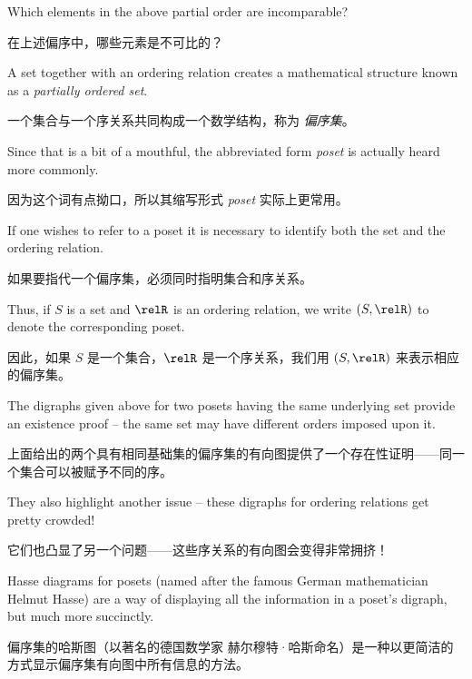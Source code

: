 \begin{center}

\end{center}

\begin{exer}
Which elements in the above partial order are incomparable?
\end{exer}

\begin{exer}
在上述偏序中，哪些元素是不可比的？
\end{exer}

A set together with an ordering relation creates a mathematical 
structure known as a \emph{partially
ordered set}.

一个集合与一个序关系共同构成一个数学结构，称为 \emph{偏序集}。

Since that is a bit of a mouthful, the abbreviated
form \emph{poset} is actually heard more commonly.

因为这个词有点拗口，所以其缩写形式 \emph{poset} 实际上更常用。

If one wishes to refer to a poset it is necessary to identify
both the set and the ordering relation.

如果要指代一个偏序集，必须同时指明集合和序关系。

Thus, if $S$ is a set
and $\relR$ is an ordering relation, we write $(S, \relR)$ to
denote the corresponding poset.

因此，如果 $S$ 是一个集合，$\relR$ 是一个序关系，我们用 $(S, \relR)$ 来表示相应的偏序集。

The digraphs given above for two posets having the same underlying
set provide an existence proof -- the same set may have different 
orders imposed upon it.

上面给出的两个具有相同基础集的偏序集的有向图提供了一个存在性证明——同一个集合可以被赋予不同的序。

They also highlight another issue -- these
digraphs for ordering relations get pretty crowded!

它们也凸显了另一个问题——这些序关系的有向图会变得非常拥挤！

Hasse diagrams
for posets (named after the famous German mathematician 
Helmut Hasse) are a way of displaying all the 
information in a poset's digraph, but much more succinctly.

偏序集的哈斯图（以著名的德国数学家 赫尔穆特·哈斯命名）是一种以更简洁的方式显示偏序集有向图中所有信息的方法。

